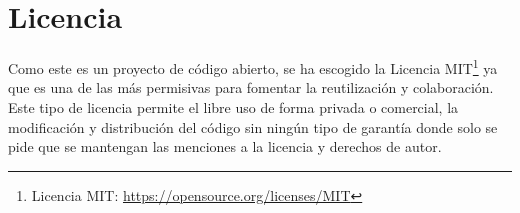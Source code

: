 \documentclass[11pt,spanish,listoffigures,listoftables]{tfgetsinf}
\begin{document}
\chapter{Licencia}

Como este es un proyecto de código abierto, se ha escogido la Licencia MIT\footnote{Licencia MIT: \url{https://opensource.org/licenses/MIT}} ya que es una de las más permisivas para fomentar la reutilización y colaboración. Este tipo de licencia permite el libre uso de forma privada o comercial, la modificación y distribución del código sin ningún tipo de garantía donde solo se pide que se mantengan las menciones a la licencia y derechos de autor.


\glsaddall
\printglossary[title=Acrónimos,type=\acronymtype]

\glsaddall
\printglossary[title=Términos,toctitle=Terms and abbreviations]
\end{document}
